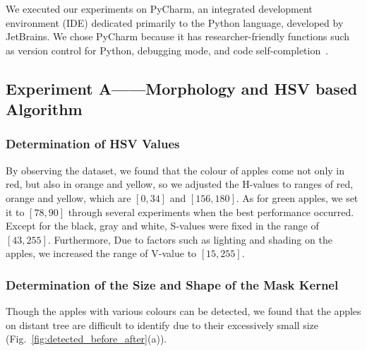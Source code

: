 We executed our experiments on PyCharm, an integrated development environment (IDE) dedicated primarily to the Python language, developed by JetBrains. We chose PyCharm because it has researcher-friendly functions such as version control for Python, debugging mode, and code self-completion~\citep{JetBrains2022}.


\subsection{Experiment A——Morphology and HSV based Algorithm}

\subsubsection{Determination of HSV Values}
By observing the dataset, we found that the colour of apples come not only in red, but also in orange and yellow, so we adjusted the H-values to ranges of red, orange and yellow, which are $[0, 34]$ and $[156, 180]$. As for green apples, we set it to $[78, 90]$ through several experiments when the best performance occurred. Except for the black, gray and white, S-values were fixed in the range of $[43, 255]$. Furthermore, Due to factors such as lighting and shading on the apples, we increased the range of V-value to $[15, 255]$. 

\subsubsection{Determination of the Size and Shape of the Mask Kernel}
Though the apples with various colours can be detected, we found that the apples on distant tree are difficult to identify due to their excessively small size (Fig.~\ref{fig:detected_before_after}(a)).

